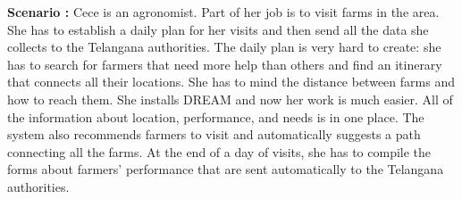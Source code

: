 \begin{flushleft}
\textbf{Scenario :} 
Cece is an agronomist. Part of her job is to visit farms in the area. She has to establish a daily plan for her visits and then send all the data she collects to the Telangana authorities. The daily plan is very hard to create: she has to search for farmers that need more help than others and find an itinerary that connects all their locations. She has to mind the distance between farms and how to reach them. She installs DREAM and now her work is much easier. All of the information about location, performance, and needs is in one place. The system also recommends farmers to visit and automatically suggests a path connecting all the farms. At the end of a day of visits, she has to compile the forms about farmers' performance that are sent automatically to the Telangana authorities.
\end{flushleft}